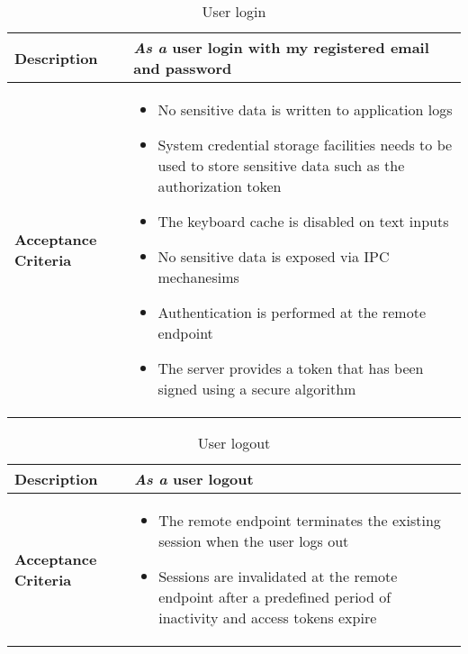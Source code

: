 \begin{table}
    \centering
    \caption{User login}
    \label{tab:user-login}
    \begin{tabulary}{1.0\textwidth}{|l|L|}
        \hline
        \textbf{Description} & \textit{As a} user  login with my registered email and password \\
        \hline
        \textbf{Acceptance Criteria} & 
        \begin{itemize}
            \item No sensitive data is written to application logs
            \item System credential storage facilities needs to be used to store sensitive data such as the authorization token
            \item The keyboard cache is disabled on text inputs
            \item No sensitive data is exposed via IPC mechanesims
            \item Authentication is performed at the remote endpoint
            \item The server provides a token that has been signed using a secure algorithm
        \end{itemize} \\
        \hline
    \end{tabulary}
\end{table}

\begin{table}
    \centering
    \caption{User logout}
    \label{tab:user-logut}
    \begin{tabulary}{1.0\textwidth}{|l|L|}
        \hline
        \textbf{Description} & \textit{As a} user  logout \\
        \hline
        \textbf{Acceptance Criteria} & 
        \begin{itemize}
            \item The remote endpoint terminates the existing session when the user logs out
            \item Sessions are invalidated at the remote endpoint after a predefined period of inactivity and access tokens expire
        \end{itemize} \\
        \hline
    \end{tabulary}
\end{table}
